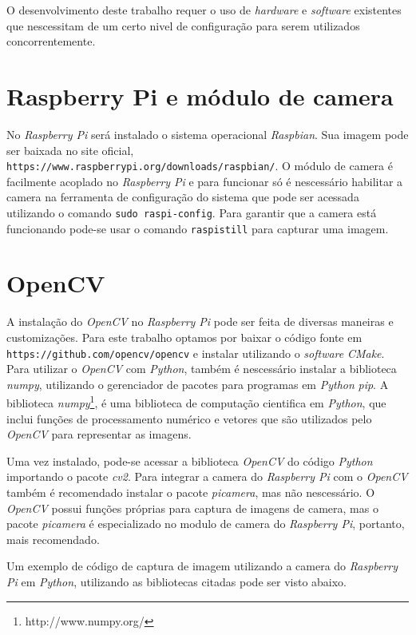 O desenvolvimento deste trabalho requer o uso de \emph{hardware} e \emph{software} existentes 
que nescessitam de um certo nivel de configuração para serem utilizados concorrentemente.

\section{Raspberry Pi e módulo de camera}
\label{sec:confrpi}

No \emph{Raspberry Pi} será instalado o sistema operacional \emph{Raspbian}. Sua imagem pode ser baixada no 
site oficial, \texttt{https://www.raspberrypi.org/downloads/raspbian/}. O módulo de camera é facilmente acoplado no 
\emph{Raspberry Pi} e para funcionar só é nescessário habilitar a camera na ferramenta de configuração do sistema que pode 
ser acessada utilizando o comando \texttt{sudo raspi-config}. Para garantir que a camera está funcionando pode-se usar o 
comando \texttt{raspistill} para capturar uma imagem.

\section{OpenCV}
\label{sec:confopencv} 

A instalação do \emph{OpenCV} no \emph{Raspberry Pi} pode ser feita de diversas maneiras e customizações. 
Para este trabalho optamos por baixar o código fonte em \texttt{https://github.com/opencv/opencv} e instalar 
utilizando o \emph{software} \emph{CMake}. Para utilizar o \emph{OpenCV} com \emph{Python}, também é nescessário 
instalar a biblioteca \emph{numpy}, utilizando o gerenciador de pacotes para programas em \emph{Python} \emph{pip}.
A biblioteca \emph{numpy}\footnote{http://www.numpy.org/}, é uma biblioteca de computação cientifica em \emph{Python}, 
que inclui funções de processamento numérico e vetores que são utilizados pelo \emph{OpenCV} para representar as imagens.

Uma vez instalado, pode-se acessar a biblioteca \emph{OpenCV} do código \emph{Python} importando o pacote \emph{cv2}. 
Para integrar a camera do \emph{Raspberry Pi} com o \emph{OpenCV} também é recomendado instalar o pacote \emph{picamera},
mas não nescessário. O \emph{OpenCV} possui funções próprias para captura de imagens de camera, mas o pacote \emph{picamera} 
é especializado no modulo de camera do \emph{Raspberry Pi}, portanto, mais recomendado.

Um exemplo de código de captura de imagem utilizando a camera do \emph{Raspberry Pi} em \emph{Python}, utilizando 
as bibliotecas citadas pode ser visto abaixo.

